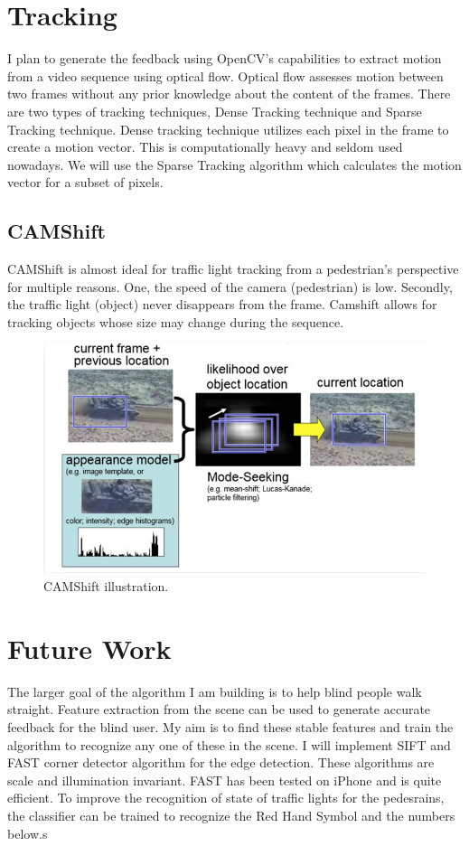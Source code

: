\section{Tracking}
I plan to generate the feedback using OpenCV’s capabilities to extract motion from a video sequence using optical flow. Optical flow assesses motion between two frames without any prior knowledge about the content of the frames. There are two types of tracking techniques, Dense Tracking technique and Sparse Tracking technique. Dense tracking technique utilizes each pixel in the frame to create a motion vector. This is computationally heavy and seldom used nowadays. We will use the Sparse Tracking algorithm which calculates the motion vector for a subset of pixels.
\subsection{CAMShift}
CAMShift is almost ideal for traffic light tracking from a pedestrian's perspective for multiple reasons. One, the speed of the camera (pedestrian) is low. Secondly, the traffic light (object) never disappears from the frame. Camshift allows for tracking objects whose size may change during the sequence. 
\begin{figure}
\begin{center}
\includegraphics[scale=0.5]{camshift.png}
\caption{CAMShift illustration.}
\label{fig:camshift}
\end{center}
\end{figure}

\section{Future Work}
The larger goal of the algorithm I am building is to help blind people walk straight. Feature extraction from the scene can be used to generate accurate feedback for the blind user. My aim is to find these stable features and train the algorithm to recognize any one of these in the scene. I will implement SIFT and FAST corner detector algorithm for the edge detection. These algorithms are scale and illumination invariant. FAST has been tested on iPhone and is quite efficient. To improve the recognition of state of traffic lights for the pedesrains, the classifier can be trained to recognize the Red Hand Symbol and the numbers below.s




